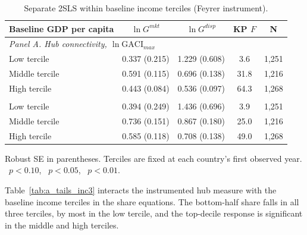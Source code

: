 \begin{table}[H]\centering\caption{Separate 2SLS within baseline income terciles (Feyrer instrument).}\label{tab:a_inc3split}
\begin{threeparttable}\small\begin{tabular}{lcccc}
\toprule
Baseline GDP per capita & $\ln G^{mkt}$ & $\ln G^{disp}$ & KP $F$ & N \\
\midrule
\multicolumn{5}{l}{\emph{Panel A. Hub connectivity, $\ln\mathrm{GACI}_{max}$}}\\
Low tercile & 0.337 (0.215) & 1.229\sym{**} (0.608) & 3.6 & 1,251 \\
Middle tercile & 0.591\sym{***} (0.115) & 0.696\sym{***} (0.138) & 31.8 & 1,216 \\
High tercile & 0.443\sym{***} (0.084) & 0.536\sym{***} (0.097) & 64.3 & 1,268 \\
\addlinespace
\multicolumn{5}{l}{\emph{Panel B. Hub quality, $\ln\mathrm{GACI}_{cwm}$}}\\
Low tercile & 0.394 (0.249) & 1.436\sym{**} (0.696) & 3.9 & 1,251 \\
Middle tercile & 0.736\sym{***} (0.151) & 0.867\sym{***} (0.180) & 25.0 & 1,216 \\
High tercile & 0.585\sym{***} (0.118) & 0.708\sym{***} (0.138) & 49.0 & 1,268 \\
\bottomrule
\end{tabular}
\begin{tablenotes}\footnotesize\item Robust SE in parentheses. Terciles are fixed at each country's first observed year. \sym{*}~$p<0.10$, \sym{**}~$p<0.05$, \sym{***}~$p<0.01$.\end{tablenotes}\end{threeparttable}\end{table}

Table~\ref{tab:a_tails_inc3} interacts the instrumented hub measure with the baseline income terciles in the share equations. The bottom-half share falls in all three terciles, by most in the low tercile, and the top-decile response is significant in the middle and high terciles.

